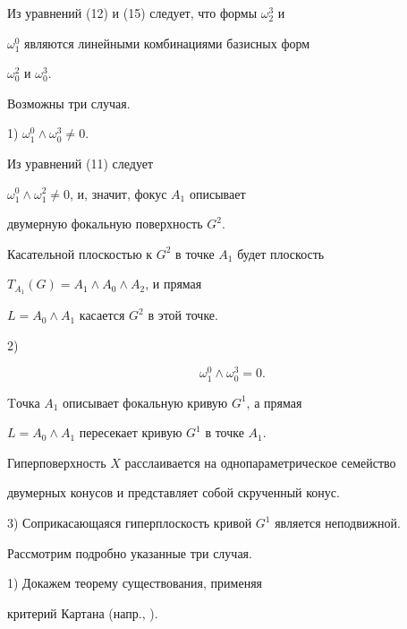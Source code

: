 Из уравнений (12) и (15) следует, что формы $\omega_2^3$ и


$\omega_1^0$ являются линейными комбинациями базисных форм


$\omega_0^2$ и $\omega_0^3$.


Возможны три случая.





1) $\omega_1^0 \wedge \omega_0^3 \neq 0$.


Из уравнений (11) следует


$\omega_1^0 \wedge \omega_1^2 \neq 0$, и, значит, фокус $A_1$ описывает


двумерную фокальную поверхность $G^2$.


Касательной плоскостью к $G^2$ в точке  $A_1$ будет плоскость


$T_{A_1} (G) = A_1 \wedge A_0 \wedge A_2$, и прямая


$L = A_0 \wedge A_1$ касается $G^2$ в  этой точке.





2)


\begin{equation}\label{eq:21}


\omega_1^0 \wedge \omega_0^3  = 0.


\end{equation}


Tочка $A_1$ описывает фокальную кривую $G^1$, а прямая


$L = A_0 \wedge A_1$ пересекает кривую  $G^1$ в точке $A_1$.


Гиперповерхность $X$ расслаивается на однопараметрическое семейство


двумерных конусов и представляет собой скрученный конус.





3) Соприкасающаяся гиперплоскость кривой  $G^1$  является неподвижной.





Рассмотрим подробно указанные три случая.





1) Докажем теорему существования, применяя


критерий Картана (напр., \cite{BCGGG91}).





